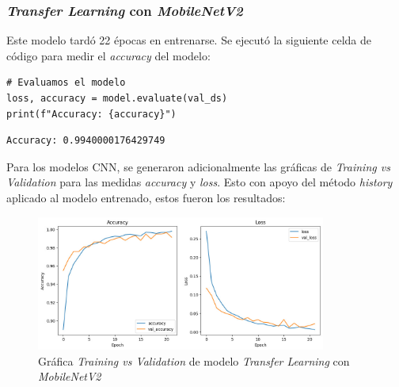 \newpage

\subsubsection{\textit{Transfer Learning} con \textit{MobileNetV2}}

Este modelo tardó 22 épocas en entrenarse. Se ejecutó la siguiente celda de código para medir el \textit{accuracy} del modelo:


\begin{lstlisting}[caption={Código para la impresión del \textit{accuracy} del modelo}]
# Evaluamos el modelo
loss, accuracy = model.evaluate(val_ds)
print(f"Accuracy: {accuracy}")
\end{lstlisting}


\begin{lstlisting}[caption={Impresión \textit{accuracy} del modelo}]
Accuracy: 0.9940000176429749
\end{lstlisting}

Para los modelos CNN, se generaron adicionalmente las gráficas de \textit{Training vs Validation} para las medidas \textit{accuracy} y \textit{loss}. Esto con apoyo del método \textit{history} aplicado al modelo entrenado, estos fueron los resultados: 

\begin{figure}[H]
    \centering
    \includegraphics[width=0.85\textwidth]{Francisco/Imagenes resultados/TvsV1.jpeg} 
    \caption{Gráfica \textit{Training vs Validation} de modelo \textit{Transfer Learning} con \textit{MobileNetV2}}
\end{figure}

